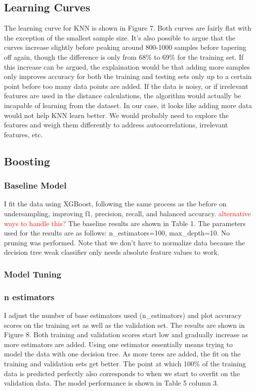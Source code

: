 \documentclass{article}
\newcommand\todo[1]{\textcolor{red}{#1}}
\begin{document}
\subsection*{Learning Curves}

The learning curve for KNN is shown in Figure 7. Both curves are fairly flat with the exception of the smallest sample size. It's also possible to argue that the curves increase slightly before peaking around 800-1000 samples before tapering off again, though the difference is only from 68\% to 69\% for the training set. If this increase can be argued, the explaination would be that adding more samples only improves accuracy for both the training and testing sets only up to a certain point before too many data points are added. If the data is noisy, or if irrelevant features are used in the distance calculations, the algorithm would actually be incapable of learning from the dataset. In our case, it looks like adding more data would not help KNN learn better. We would probably need to explore the features and weigh them differently to address autocorrelations, irrelevant features, etc. 


\subsection{Boosting}
\subsubsection*{Baseline Model}
I fit the data using XGBoost, following the same process as the before on undersampling, improving f1, precision, recall, and balanced accuracy. \todo{ alternative ways to handle this? } The baseline results are shown in Table 1. The parameters used for the results are as follows: n\_estimators=100, max\_depth=10. No pruning was performed. Note that we don't have to normalize data because the decision tree weak classifier only needs absolute feature values to work. 

\subsubsection*{Model Tuning}
\subsubsection*{n estimators}
I adjust the number of base estimators used (n\_estimators) and plot accuracy scores on the training set as well as the validation set. The results are shown in Figure 8. Both training and validation scores start low and gradually increase as more estimators are added. Using one estimator essentially means trying to model the data with one decision tree. As more trees are added, the fit on the training and validation sets get better. The point at which 100\% of the training data is predicted perfectly also corresponds to when we start to overfit on the validation data. The model performance is shown in Table 5 column 3. 
\end{document}
